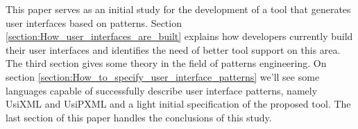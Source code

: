 This paper serves as an initial study for the development of a tool that generates user interfaces based on patterns. Section \ref{section:How_user_interfaces_are_built} explains how developers currently build their user interfaces and identifies the need of better tool support on this area. The third section gives some theory in the field of patterns engineering. On section \ref{section:How_to_specify_user_interface_patterns} we'll see some languages capable of successfully describe user interface patterns, namely UsiXML and UsiPXML and a light initial specification of the proposed tool. The last section of this paper handles the conclusions of this study.